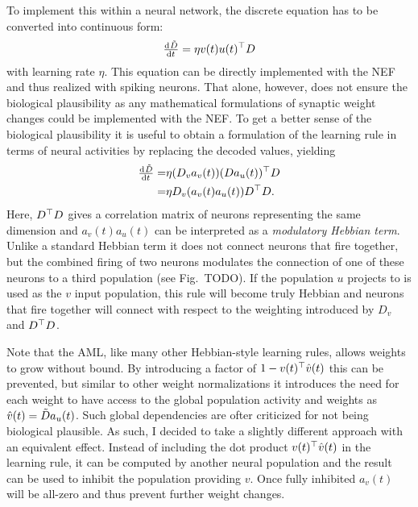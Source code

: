 To implement this within a neural network, the discrete equation has to be converted into continuous form:
\begin{equation}
    \od{\tilde{\mat D}}{t} = \eta \vc v(t) \vc u(t)\Tr \mat D
\end{equation}
with learning rate $\eta$.
This equation can be directly implemented with the NEF and thus realized with spiking neurons.
That alone, however, does not ensure the biological plausibility as any mathematical formulations of synaptic weight changes could be implemented with the NEF\@.
To get a better sense of the biological plausibility it is useful to obtain a formulation of the learning rule in terms of neural activities by replacing the decoded values, yielding
\begin{eqnarray}
    \od{\tilde{\mat D}}{t} =& \eta (D_v a_v(t)) (D a_u(t))\Tr D \\
    =& \eta D_v (a_v(t) a_u(t)) D\Tr D \text{.}
\end{eqnarray}
Here, $D^{\top} D$ gives a correlation matrix of neurons representing the same dimension and $a_v(t) a_u(t)$ can be interpreted as a \emph{modulatory Hebbian term}.
Unlike a standard Hebbian term it does not connect neurons that fire together, but the combined firing of two neurons modulates the connection of one of these neurons to a third population (see Fig.~TODO).
If the population $u$ projects to is used as the $v$ input population, this rule will become truly Hebbian and neurons that fire together will connect with respect to the weighting introduced by $D_v$ and $D^{\top} D$.

Note that the AML, like many other Hebbian-style learning rules, allows weights to grow without bound.
By introducing a factor of $1 - v(t)^{\top} \hat{v}(t)$ this can be prevented, but similar to other weight normalizations it introduces the need for each weight to have access to the global population activity and weights as $\hat{v}(t) = \tilde{D} a_u(t)$.
Such global dependencies are ofter criticized for not being biological plausible.
As such, I decided to take a slightly different approach with an equivalent effect.
Instead of including the dot product $v(t)^{\top} \hat{v}(t)$ in the learning rule, it can be computed by another neural population and the result can be used to inhibit the population providing $v$.
Once fully inhibited $a_v(t)$ will be all-zero and thus prevent further weight changes.
